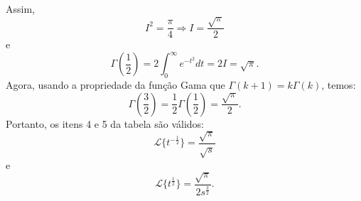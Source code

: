 \begin{ex}
\begin{equation}
\end{equation}
Assim,
\begin{equation}
I^2=\frac{\pi}{4}\Rightarrow I=\frac{\sqrt{\pi}}{2}
\end{equation}
e
\begin{equation}
\Gamma\left(\frac{1}{2}\right)=2\int_{0}^{\infty}e^{-t^2}dt=2I=\sqrt{\pi}.
\end{equation}
Agora, usando a propriedade da função Gama que $\Gamma(k+1)=k\Gamma(k)$, temos:
\begin{equation}
\Gamma\left(\frac{3}{2}\right)=\frac{1}{2}\Gamma\left(\frac{1}{2}\right)=\frac{\sqrt{\pi}}{2}.
\end{equation}
Portanto, os itens 4 e 5 da tabela são válidos:
\begin{equation}
 \mathcal{L}\{t^{-\frac{1}{2}}\}=\frac{\sqrt{\pi}}{\sqrt{s}}
\end{equation}
e
\begin{equation}
 \mathcal{L}\{t^{\frac{1}{2}}\}=\frac{\sqrt{\pi}}{2s^{\frac{3}{2}}}.
\end{equation}
 \end{ex}
